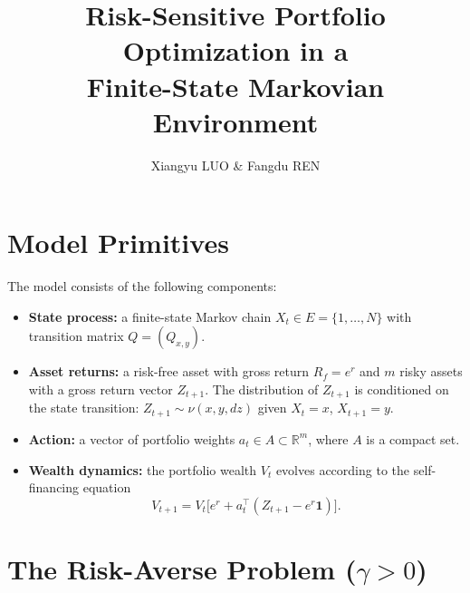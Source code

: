 \documentclass[11pt,a4paper]{article}
\title{Risk-Sensitive Portfolio Optimization in a\\ Finite-State Markovian Environment}
\author{Xiangyu LUO \& Fangdu REN}
\date{}
\newcommand{\R}{\mathbb{R}}
\begin{document}
\maketitle
\thispagestyle{empty}

\section{Model Primitives}

The model consists of the following components:
\begin{itemize}
  \item \textbf{State process:} a finite-state Markov chain $X_t\in E=\{1,\dots,N\}$ with transition matrix $Q=(Q_{x,y})$.
  \item \textbf{Asset returns:} a risk-free asset with gross return $R_f=e^{r}$ and $m$ risky assets with a gross return vector $Z_{t+1}$. The distribution of $Z_{t+1}$ is conditioned on the state transition: $Z_{t+1}\sim\nu(x,y,dz)$ given $X_t=x$, $X_{t+1}=y$.
  \item \textbf{Action:} a vector of portfolio weights $a_t\in A\subset\R^m$, where $A$ is a compact set.
  \item \textbf{Wealth dynamics:} the portfolio wealth $V_t$ evolves according to the self-financing equation
  \[
    V_{t+1}=V_t\big[e^{r}+a_t^\top(Z_{t+1}-e^{r}\mathbf 1)\big].
  \]
\end{itemize}

\section{The Risk-Averse Problem ($\gamma>0$)}
\end{document}
